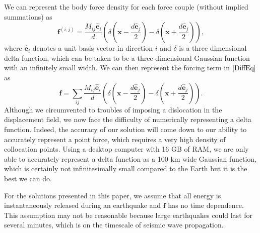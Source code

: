 \documentclass[12pt]{article}
\begin{document}
We can represent the body force density for each force couple (without
implied summations) as
\begin{equation}\label{ForceCouples}
 \boldsymbol{f}^{(i,j)} =
 \frac{M_{ij}\boldsymbol{\hat{e}}_i}{d}
 \left(\delta\left(\boldsymbol{x} -
 \frac{d\boldsymbol{\hat{e}}_j}{2}\right) - \delta\left(\boldsymbol{x} +
 \frac{d\boldsymbol{\hat{e}}_j}{2}\right)\right),
\end{equation}
where $\mathbf{\hat{e}}_i$ denotes a unit basis vector in direction
$i$ and $\delta$ is a three dimensional delta function, which can be
taken to be a three dimensional Gaussian function with an infinitely
small width.  We can then represent the forcing term in 
$\ref{DiffEq}$ as 
\begin{equation}
 \boldsymbol{f} = \sum_{ij}  
 \frac{M_{ij}\boldsymbol{\hat{e}}_i}{d}\left(\delta\left(\boldsymbol{x} -
 \frac{d\boldsymbol{\hat{e}}_j}{2}\right) - \delta\left(\boldsymbol{x} +
 \frac{d\boldsymbol{\hat{e}}_j}{2}\right)\right).
\end{equation}
Although we circumvented to troubles of imposing a dislocation in the
displacement field, we now face the difficulty of numerically
representing a delta function.  Indeed, the accuracy of our solution
will come down to our ability to accurately represent a point force,
which requires a very high density of collocation points.  Using a
desktop computer with 16 GB of RAM, we are only able to accurately
represent a delta function as a 100 km wide Gaussian function, which
is certainly not infinitesimally small compared to the Earth but it is
the best we can do.  

For the solutions presented in this paper, we assume that all energy
is instantaneously released during an earthquake and $\boldsymbol{f}$
has no time dependence.  This assumption may not be reasonable because
large earthquakes could last for several minutes, which is on the
timescale of seismic wave propagation.  
\end{document}
